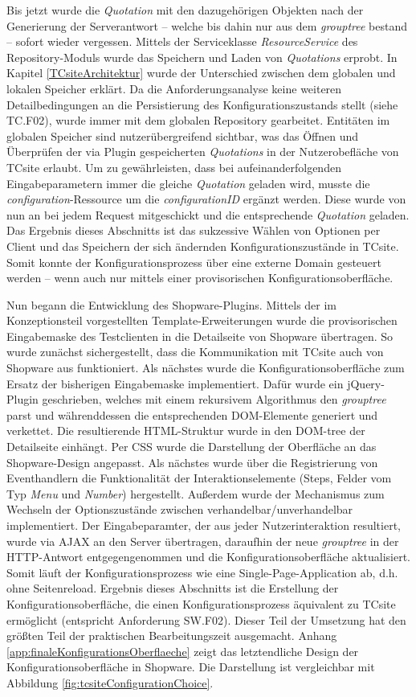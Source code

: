 \documentclass[11pt, a4paper, titlepage, listof=totoc, bibliography=totoc, index=totoc, twoside, openright, headings=normal]{scrreprt}
\begin{document}
Bis jetzt wurde die \emph{Quotation} mit den dazugehörigen Objekten nach der Generierung der Serverantwort -- welche bis dahin nur aus dem \emph{grouptree} bestand -- sofort wieder vergessen. Mittels der Serviceklasse \emph{ResourceService} des Repository-Moduls wurde das Speichern und Laden von \emph{Quotations} erprobt. In Kapitel \ref{TCsiteArchitektur} wurde der Unterschied zwischen dem globalen und lokalen Speicher erklärt. Da die Anforderungsanalyse keine weiteren Detailbedingungen an die Persistierung des Konfigurationszustands stellt (siehe TC.F02), wurde immer mit dem globalen Repository gearbeitet. Entitäten im globalen Speicher sind nutzerübergreifend sichtbar, was das Öffnen und Überprüfen der via Plugin gespeicherten \emph{Quotations} in der Nutzerobefläche von TCsite erlaubt. Um zu gewährleisten, dass bei aufeinanderfolgenden Eingabeparametern immer die gleiche \emph{Quotation} geladen wird, musste die \emph{configuration}-Ressource um die \emph{configurationID} ergänzt werden. Diese wurde von nun an bei jedem Request mitgeschickt und die entsprechende \emph{Quotation} geladen. Das Ergebnis dieses Abschnitts ist das sukzessive Wählen von Optionen per Client und das Speichern der sich ändernden Konfigurationszustände in TCsite. Somit konnte der Konfigurationsprozess über eine externe Domain gesteuert werden -- wenn auch nur mittels einer provisorischen Konfigurationsoberfläche.

Nun begann die Entwicklung des Shopware-Plugins. Mittels der im Konzeptionsteil vorgestellten Template-Erweiterungen wurde die provisorischen Eingabemaske des Testclienten in die Detailseite von Shopware übertragen. So wurde zunächst sichergestellt, dass die Kommunikation mit TCsite auch von Shopware aus funktioniert. Als nächstes wurde die Konfigurationsoberfläche zum Ersatz der bisherigen Eingabemaske implementiert. Dafür wurde ein jQuery-Plugin geschrieben, welches mit einem rekursivem Algorithmus den \emph{grouptree} parst und währenddessen die entsprechenden DOM-Elemente generiert und verkettet. Die resultierende HTML-Struktur wurde in den DOM-tree der Detailseite einhängt. Per CSS wurde die Darstellung der Oberfläche an das Shopware-Design angepasst. Als nächstes wurde über die Registrierung von Eventhandlern die Funktionalität der Interaktionselemente (Steps, Felder vom Typ \emph{Menu} und \emph{Number}) hergestellt. Außerdem wurde der Mechanismus zum Wechseln der Optionszustände zwischen verhandelbar/unverhandelbar implementiert. Der Eingabeparamter, der aus jeder Nutzerinteraktion resultiert, wurde via AJAX an den Server übertragen, daraufhin der neue \emph{grouptree} in der HTTP-Antwort entgegengenommen und die Konfigurationsoberfläche aktualisiert. Somit läuft der Konfigurationsprozess wie eine Single-Page-Application ab, d.h. ohne Seitenreload. Ergebnis dieses Abschnitts ist die Erstellung der Konfigurationsoberfläche, die einen Konfigurationsprozess äquivalent zu TCsite ermöglicht (entspricht Anforderung SW.F02). Dieser Teil der Umsetzung hat den größten Teil der praktischen Bearbeitungszeit ausgemacht. Anhang \ref{app:finaleKonfigurationsOberflaeche} zeigt das letztendliche Design der Konfigurationsoberfläche in Shopware. Die Darstellung ist vergleichbar mit Abbildung \ref{fig:tcsiteConfigurationChoice}.
\end{document}
